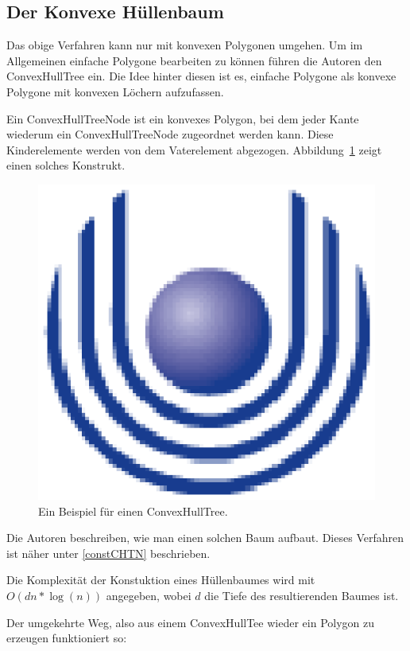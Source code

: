 \subsection{Der Konvexe Hüllenbaum}

Das obige Verfahren kann nur mit konvexen Polygonen umgehen. Um im Allgemeinen einfache Polygone bearbeiten zu können führen die Autoren den ConvexHullTree ein. Die Idee hinter diesen ist es, einfache Polygone als konvexe Polygone mit konvexen Löchern aufzufassen. 

Ein ConvexHullTreeNode ist ein konvexes Polygon, bei dem jeder Kante wiederum ein ConvexHullTreeNode zugeordnet werden kann. Diese Kinderelemente werden von dem Vaterelement abgezogen. Abbildung~\ref{fig:ConHullTree} zeigt einen solches Konstrukt.

\begin{figure}
	\centering
	\includegraphics{feu_logo2.eps}
	\caption{Ein Beispiel für einen ConvexHullTree.}
	\label{fig:ConHullTree}
\end{figure}

Die Autoren beschreiben, wie man einen solchen Baum aufbaut. Dieses Verfahren ist näher unter \ref{constCHTN} beschrieben.

Die Komplexität der Konstuktion eines Hüllenbaumes wird mit $O(dn*\log(n))$ angegeben, wobei $d$ die Tiefe des resultierenden Baumes ist.

Der umgekehrte Weg, also aus einem ConvexHullTee wieder ein Polygon zu erzeugen funktioniert so:

